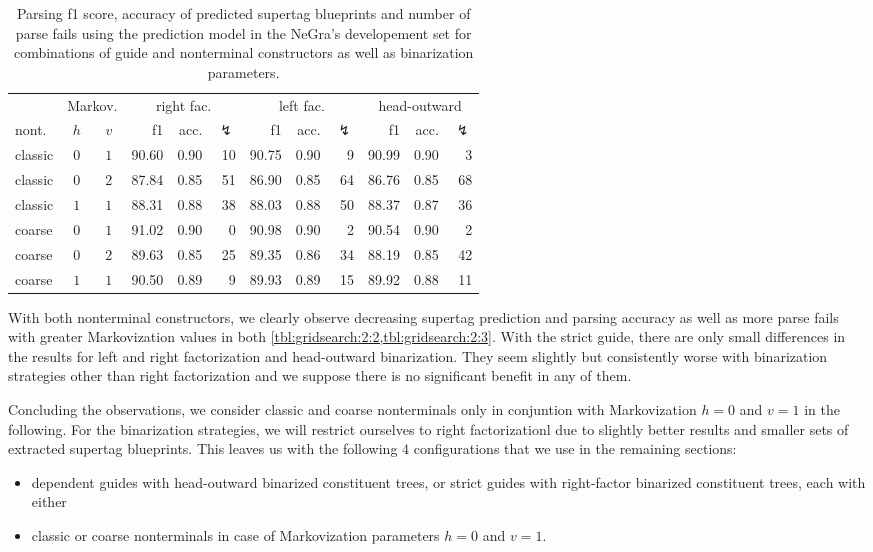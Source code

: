 \documentclass[../../document.tex]{subfiles}
\begin{document}
    \begin{table}
        \caption{\label{tbl:gridsearch:2:3}
        Parsing f1 score, accuracy of predicted supertag blueprints and number of parse fails using the  prediction model in the NeGra's developement set for combinations of guide and nonterminal constructors as well as binarization parameters.
        }
        \centering
        \vspace{.2cm}
        \begin{tabular}{lcc|rrr|rrr|rrr}
            \toprule
& \multicolumn{2}{c|}{Markov.}         & \multicolumn{3}{c|}{right fac.} & \multicolumn{3}{c|}{left fac.} & \multicolumn{3}{c}{head-outward} \\
nont.  & \(h\) &\(v\) & f1 & acc. & $\lightning$ & f1 & acc. & $\lightning$ & f1 & acc. & $\lightning$  \\ \hline
classic & \(0\) & \(1\) & 90.60 & 0.90 & 10 & 90.75 & 0.90 & 9 & 90.99 & 0.90 & 3 \\
classic & \(0\) & \(2\) & 87.84 & 0.85 & 51 & 86.90 & 0.85 & 64 & 86.76 & 0.85 & 68 \\
classic & \(1\) & \(1\) & 88.31 & 0.88 & 38 & 88.03 & 0.88 & 50 & 88.37 & 0.87 & 36 \\\hline
coarse  & \(0\) & \(1\) & 91.02 & 0.90 & 0 & 90.98 & 0.90 & 2 & 90.54 & 0.90 & 2 \\
coarse  & \(0\) & \(2\) & 89.63 & 0.85 & 25 & 89.35 & 0.86 & 34 & 88.19 & 0.85 & 42 \\
coarse  & \(1\) & \(1\) & 90.50 & 0.89 & 9 & 89.93 & 0.89 & 15 & 89.92 & 0.88 & 11 \\
\bottomrule
        \end{tabular}
    \end{table}

    With both nonterminal constructors, we clearly observe decreasing supertag prediction and parsing accuracy as well as more parse fails with greater Markovization values in both \cref{tbl:gridsearch:2:2,tbl:gridsearch:2:3}.
    With the strict guide, there are only small differences in the results for left and right factorization and head-outward binarization.
    They seem slightly but consistently worse with binarization strategies other than right factorization and we suppose there is no significant benefit in any of them.

    Concluding the observations, we consider classic and coarse nonterminals only in conjuntion with Markovization \(h=0\) and \(v=1\) in the following.
    For the binarization strategies, we will restrict ourselves to right factorizationl due to slightly better results and smaller sets of extracted supertag blueprints.
    This leaves us with the following \(4\) configurations that we use in the remaining sections:
    \begin{itemize}
        \item dependent guides with head-outward binarized constituent trees, or strict guides with right-factor binarized constituent trees, each with either
        \item classic or coarse nonterminals in case of Markovization parameters \(h=0\) and \(v=1\).
    \end{itemize}
\end{document}
